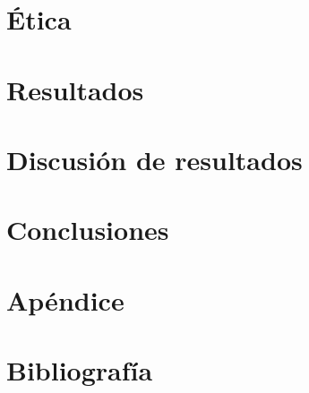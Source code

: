 \documentclass{proc}
\begin{document}
\section{Ética}

\section{Resultados}

\section{Discusión de resultados}

\section{Conclusiones}

\section{Apéndice}

\section{Bibliografía}
\end{document}
